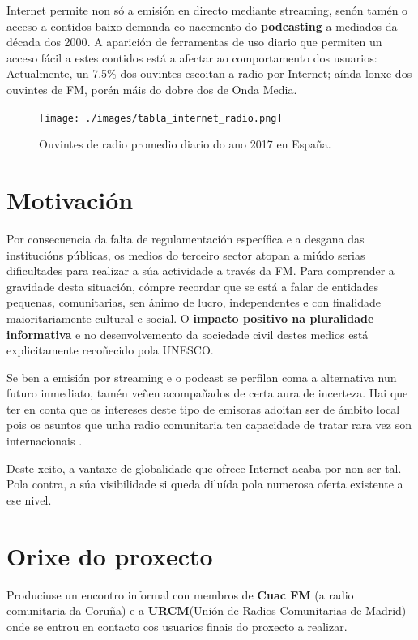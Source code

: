 Internet permite non só a emisión en directo mediante streaming, senón tamén o acceso a contidos baixo demanda co nacemento do \textbf{podcasting} a mediados da década dos 2000\cite{guardian}. A aparición de ferramentas de uso diario que permiten un acceso fácil a estes contidos está a afectar ao comportamento dos usuarios: Actualmente, un 7.5\% dos ouvintes escoitan a radio por Internet; aínda lonxe dos ouvintes de FM, porén máis do dobre dos de Onda Media\cite{EGM}.

\begin{figure}[H]
	\centering
	\texttt{[image: ./images/tabla\_internet\_radio.png]}
  	\caption{Ouvintes de radio promedio diario do ano 2017 en España.}
	\label{fig:table_egm}
\end{figure}

\section{Motivación}

Por consecuencia da falta de regulamentación específica e a desgana das institucións públicas, os medios do  terceiro sector atopan a miúdo serias dificultades para realizar a súa actividade a través da FM. Para comprender a gravidade desta situación, cómpre recordar que se está a falar de entidades pequenas, comunitarias, sen ánimo de lucro, independentes e con finalidade maioritariamente cultural e social\cite{fesp}. O \textbf{impacto positivo na pluralidade informativa} e no desenvolvemento da sociedade civil destes medios está explicitamente recoñecido pola UNESCO\cite{unesco}. 

Se ben a emisión por streaming e o podcast se perfilan coma a alternativa nun futuro inmediato, tamén veñen acompañados de certa aura de incerteza. Hai que ter en conta que os intereses deste tipo de emisoras adoitan ser de ámbito local pois os asuntos que unha radio comunitaria ten capacidade de tratar rara vez son internacionais . 

Deste xeito, a vantaxe de globalidade que ofrece Internet acaba por non ser tal. Pola contra, a súa visibilidade si queda diluída pola numerosa oferta existente a ese nivel.


\section{Orixe do proxecto}
\label{orixe}

Produciuse un encontro informal con membros de \textbf{Cuac FM} (a radio comunitaria da Coruña) e a \textbf{URCM}(Unión de Radios Comunitarias de Madrid) onde se entrou en contacto cos usuarios finais do proxecto a realizar. 

